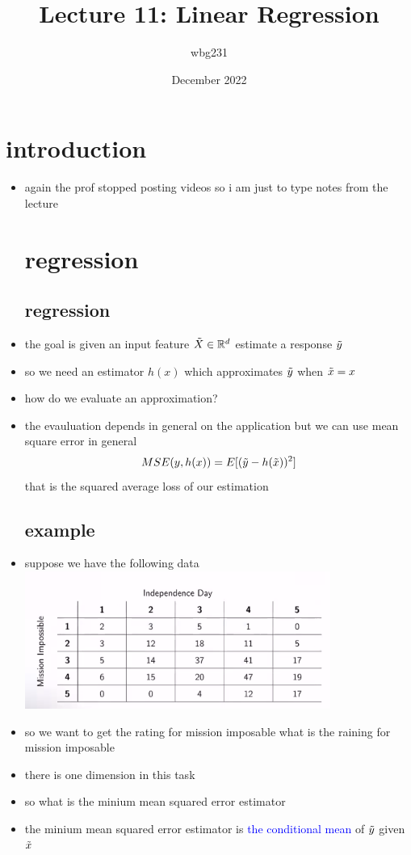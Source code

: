 \documentclass{article}
\title{Lecture 11: Linear Regression}
\author{wbg231 }
\date{December 2022}
\begin{document}
\maketitle

\section{introduction}
\begin{itemize}
\item again the prof stopped posting videos so i am just 
to type notes from the lecture 
\section{regression}
\subsection*{regression}
\item the goal is given an input feature $\Tilde{X}\in\mathbb{R}^d$ estimate a response
$\Tilde{y}$
\item so we need an estimator $h(x)$ which approximates $\Tilde{y}$ when $\Tilde{x}=x$
\item how do we evaluate an approximation?
\item the evauluation depends in general on the application but we can use mean square error 
in general 
$$MSE(y,h(x))=E[(\Tilde{y}-h(\Tilde{x}))^2]$$ that is the squared average loss of our estimation
\subsection*{example}
\item suppose we have the following data \\\includegraphics*[width=10cm]{notes/week_11/immages/w11_1.png}
\item so we want to get the rating for mission imposable what is the raining for mission imposable
\item there is one dimension in this task 
\item so what is the minium mean squared error estimator 
\item the minium mean squared error  estimator is \textcolor{blue}{the conditional mean} of $\Tilde{y}$ given $\Tilde{x}$

\end{itemize}
\end{document}
